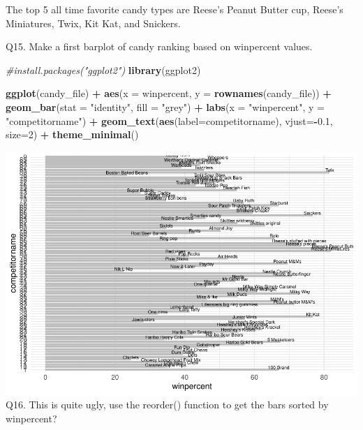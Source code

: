 \documentclass[
]{article}
\newenvironment{Shaded}{\begin{snugshade}}{\end{snugshade}}
\newcommand{\AttributeTok}[1]{\textcolor[rgb]{0.13,0.29,0.53}{#1}}
\newcommand{\CommentTok}[1]{\textcolor[rgb]{0.56,0.35,0.01}{\textit{#1}}}
\newcommand{\DecValTok}[1]{\textcolor[rgb]{0.00,0.00,0.81}{#1}}
\newcommand{\FloatTok}[1]{\textcolor[rgb]{0.00,0.00,0.81}{#1}}
\newcommand{\FunctionTok}[1]{\textcolor[rgb]{0.13,0.29,0.53}{\textbf{#1}}}
\newcommand{\NormalTok}[1]{#1}
\newcommand{\SpecialCharTok}[1]{\textcolor[rgb]{0.81,0.36,0.00}{\textbf{#1}}}
\newcommand{\StringTok}[1]{\textcolor[rgb]{0.31,0.60,0.02}{#1}}
\begin{document}
The top 5 all time favorite candy types are Reese's Peanut Butter cup,
Reese's Miniatures, Twix, Kit Kat, and Snickers.

Q15. Make a first barplot of candy ranking based on winpercent values.

\begin{Shaded}
\begin{Highlighting}[]
\CommentTok{\#install.packages("ggplot2")}
\FunctionTok{library}\NormalTok{(ggplot2)}

\FunctionTok{ggplot}\NormalTok{(candy\_file) }\SpecialCharTok{+} 
  \FunctionTok{aes}\NormalTok{(}\AttributeTok{x =}\NormalTok{ winpercent, }\AttributeTok{y =} \FunctionTok{rownames}\NormalTok{(candy\_file)) }\SpecialCharTok{+}
  \FunctionTok{geom\_bar}\NormalTok{(}\AttributeTok{stat =} \StringTok{"identity"}\NormalTok{, }\AttributeTok{fill =} \StringTok{"grey"}\NormalTok{) }\SpecialCharTok{+}
  \FunctionTok{labs}\NormalTok{(}\AttributeTok{x =} \StringTok{"winpercent"}\NormalTok{, }\AttributeTok{y =} \StringTok{"competitorname"}\NormalTok{) }\SpecialCharTok{+}
  \FunctionTok{geom\_text}\NormalTok{(}\FunctionTok{aes}\NormalTok{(}\AttributeTok{label=}\NormalTok{competitorname), }\AttributeTok{vjust=}\SpecialCharTok{{-}}\FloatTok{0.1}\NormalTok{, }\AttributeTok{size=}\DecValTok{2}\NormalTok{) }\SpecialCharTok{+}
  \FunctionTok{theme\_minimal}\NormalTok{()}
\end{Highlighting}
\end{Shaded}

\includegraphics{Untitled1_files/figure-latex/unnamed-chunk-17-1.pdf}
Q16. This is quite ugly, use the reorder() function to get the bars
sorted by winpercent?
\end{document}
